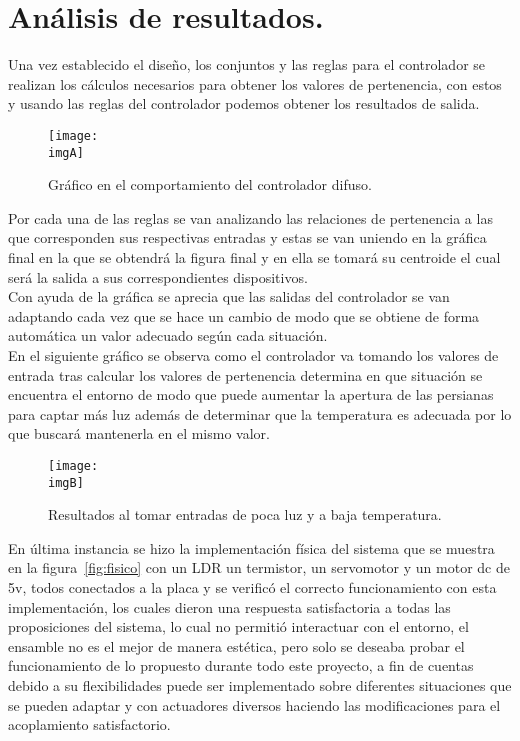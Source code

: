 \documentclass[a4paper, 12pt]{article}
\newcommand{\imgA}{img/diag1.png}
\newcommand{\imgB}{img/diag2.png}
\begin{document}
    \section{Análisis de resultados.}
	Una vez establecido el diseño, los conjuntos y las reglas para el controlador se realizan los cálculos necesarios para obtener los valores de pertenencia, con estos y usando las reglas del controlador podemos obtener los resultados de salida.

	\begin{figure}[!h]
		\centering
		\texttt{[image: \\imgA]}
		\caption{Gráfico en el comportamiento del controlador difuso.}
	\end{figure}

	Por cada una de las reglas se van analizando las relaciones de pertenencia a las que corresponden sus respectivas entradas y estas se van uniendo en la gráfica final en la que se obtendrá la figura final y en ella se tomará su centroide el cual será la salida a sus correspondientes dispositivos.\newline \\
	Con ayuda de la gráfica se aprecia que las salidas del controlador se van adaptando cada vez que se hace un cambio de modo que se obtiene de forma automática un valor adecuado según cada situación.\newline \\
	En el siguiente gráfico se observa como el controlador va tomando los valores de entrada tras calcular los valores de pertenencia determina en que situación se encuentra el entorno de modo que puede aumentar la apertura de las persianas para captar más luz además de determinar que la temperatura es adecuada por lo que buscará mantenerla en el mismo valor.

	\begin{figure}[!h]
		\centering
		\texttt{[image: \\imgB]}
		\caption{Resultados al tomar entradas de poca luz y a baja temperatura.}
	\end{figure}
    
    En última instancia se hizo la implementación física del sistema que se muestra en la figura~\ref{fig:fisico} con un LDR un termistor, un servomotor y un motor dc de 5v, todos conectados a la placa y se verificó el correcto funcionamiento con esta implementación, los cuales dieron una respuesta satisfactoria a todas las proposiciones del sistema, lo cual no permitió interactuar con el entorno, el ensamble no es el mejor de manera estética, pero solo se deseaba probar el funcionamiento de lo propuesto durante todo este proyecto, a fin de cuentas debido a su flexibilidades puede ser implementado sobre diferentes situaciones que se pueden adaptar y con actuadores diversos haciendo las modificaciones para el acoplamiento satisfactorio.
\end{document}
